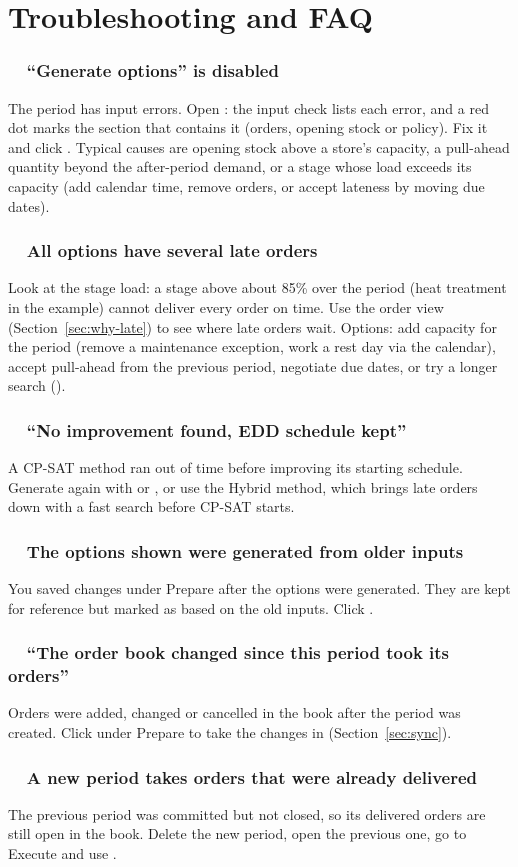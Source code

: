 \chapter{Troubleshooting and FAQ}\label{ch:faq}

\newcommand{\faq}[1]{\subsection*{\faQuestionCircle[regular]\ \ #1}}

\faq{``Generate options'' is disabled}
The period has input errors. Open : the input check lists each error, and a red dot marks the
section that contains it (orders, opening stock or policy). Fix it and click . Typical causes
are opening stock above a store's capacity, a pull-ahead quantity beyond the after-period demand, or a stage whose
load exceeds its capacity (add calendar time, remove orders, or accept lateness by moving due dates).

\faq{All options have several late orders}
Look at the stage load: a stage above about 85\% over the period (heat treatment in the example) cannot deliver
every order on time. Use the order view (Section~\ref{sec:why-late}) to see where late orders wait. Options:
add capacity for the period (remove a maintenance exception, work a rest day via the calendar), accept pull-ahead
from the previous period, negotiate due dates, or try a longer search ().

\faq{``No improvement found, EDD schedule kept''}
A CP-SAT method ran out of time before improving its starting schedule. Generate again with  or
, or use the Hybrid method, which brings late orders down with a fast search before CP-SAT starts.

\faq{The options shown were generated from older inputs}
You saved changes under Prepare after the options were generated. They are kept for reference but marked as
based on the old inputs. Click .

\faq{``The order book changed since this period took its orders''}
Orders were added, changed or cancelled in the book after the period was created. Click 
under Prepare to take the changes in (Section~\ref{sec:sync}).

\faq{A new period takes orders that were already delivered}
The previous period was committed but not closed, so its delivered orders are still open in the book. Delete the
new period, open the previous one, go to Execute and use .

